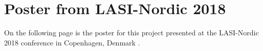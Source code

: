 \documentclass[../Main/thesis.tex]{subfiles}
\begin{document}
\chapter{Poster from LASI-Nordic 2018}
On the following page is the poster for this project presented at the LASI-Nordic 2018 conference in Copenhagen, Denmark \citep{Wake2018}. 


\end{document}
